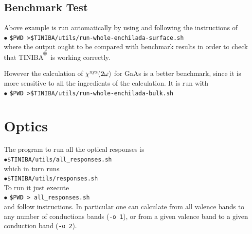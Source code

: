 \documentclass[openany,oneside]{book}
\def\reg{\textsuperscript{\textregistered}}
\numberwithin{equation}{section}
\begin{document}
\section{Benchmark Test}

Above example is run automatically by using and following the
instructions of\\
$\bullet$ \verb=$PWD >$TINIBA/utils/run-whole-enchilada-surface.sh=\\
where the output ought to be compared with benchmark results in order
to check that TINIBA$^{\reg}$ is working correctly.

However the calculation of $\chi^{\mathrm{x}\mathrm{y}\mathrm{z}}(2\omega)$ for GaAs is a
better benchmark, since it is more sensitive to all the ingredients of
the calculation. It is run with\\
$\bullet$ \verb=$PWD >$TINIBA/utils/run-whole-enchilada-bulk.sh=\\

\chapter{Optics}
 
The program to run all the optical responses is\\
$\bullet$\verb=$TINIBA/utils/all_responses.sh=\\ 
which in turn runs\\
$\bullet$\verb=$TINIBA/utils/responses.sh=\\
To run it just execute\\
$\bullet$ \verb=$PWD > all_responses.sh= \\
and follow instructions. In particular one can calculate from all
valence bands to any number of conductions bands (\verb=-o 1=),
or from a given valence band to a given conduction band (\verb=-o 2=).
\end{document}
